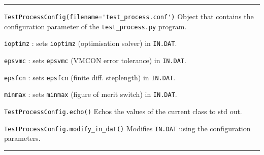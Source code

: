 \documentclass[11pt,a4paper]{article}
\newcommand{\indat}{\mbox{\texttt{IN.DAT}}}
\begin{document}
\rule{\textwidth}{0.4pt}

\begin{description}

\item{\verb|TestProcessConfig(filename='test_process.conf')|} Object that
  contains the configuration parameter of the \verb|test_process.py| program.

  \verb|ioptimz| : sets \verb|ioptimz| (optimisation solver) in \indat.

  \verb|epsvmc| : sets \verb|epsvmc| (VMCON error tolerance) in \indat.

  \verb|epsfcn| : sets \verb|epsfcn| (finite diff. steplength) in \indat.

  \verb|minmax| : sets \verb|minmax| (figure of merit switch) in \indat.

\item{\verb|TestProcessConfig.echo()|} Echos the values of the current class
  to std out.

\item{\verb|TestProcessConfig.modify_in_dat()|} Modifies \indat\/ using the
  configuration parameters.

\end{description}

\rule{\textwidth}{0.4pt}
\end{document}
